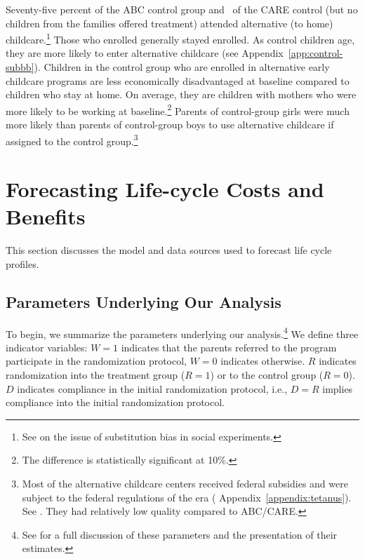 Seventy-five percent of the ABC control group and \treatsubscarec\ of the CARE control (but no children from the families offered treatment) attended alternative (to home) childcare.\footnote{See \cite{Heckman_Hohmann_etal_2000_QJE} on the issue of substitution bias in social experiments.} Those who enrolled generally stayed enrolled. As control children age, they are more likely to enter alternative childcare (see  Appendix~\ref{app:control-subbb}). Children in the control group who are enrolled in alternative early childcare programs are less economically disadvantaged at baseline compared to children who stay at home. On average, they are children with mothers who were more likely to be working at baseline.\footnote{The difference is statistically significant at 10\%.} Parents of control-group girls were much more likely than parents of control-group boys to use alternative childcare if assigned to the control group.\footnote{Most of the alternative childcare centers received federal subsidies and were subject to the federal regulations of the era ( Appendix~\ref{appendix:tetanus}). See \citet{Department-of-Health_1968_DayCareRequirements,NCGA_1971_House-Bill-100,Ramey-et-al_1977_Intro-to-ABC,Ramey_Campbell_1979_SR,Ramey_McGinness_etal_1982_Abecedarianapproach, Burchinal_Campbell_etal_1997_CD}. They had relatively low quality compared to ABC/CARE.}

\section{Forecasting Life-cycle Costs and Benefits}\label{section:cbamethodology}

This section discusses the model and data sources used to forecast life cycle profiles.

\subsection{Parameters Underlying Our Analysis}
\label{section:methodsquestions}

To begin, we summarize the parameters underlying our analysis.\footnote{See \citet{Garcia_Heckman_Ziff_2017_Gender-Diff_UNPUBLISHED} for a full discussion of these parameters and the presentation of their estimates.} We define three indicator variables: $W = 1$ indicates that the parents referred to the program participate in the randomization protocol, $W = 0$ indicates otherwise. $R$ indicates randomization into the treatment group ($R = 1$) or to the control group ($R = 0$). $D$ indicates compliance in the initial randomization protocol, i.e., $D = R$ implies compliance into the initial randomization protocol.

